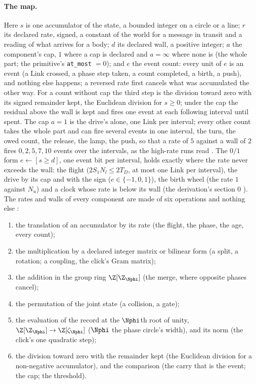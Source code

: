 \paragraph{The map.} Here $s$ is one accumulator of the state, a bounded integer on a circle
or a line; $r$ its declared rate, signed, a constant of the world for a
message in transit and a reading of what arrives for a body; $d$ its
declared wall, a positive integer; $a$ the component's cap, $1$ where a
cap is declared and $a = \infty$ where none is (the whole part; the
primitive's \texttt{at\_most} $= 0$); and $e$ the event count: every
unit of $e$ is an event (a Link crossed, a phase step taken, a count
completed, a birth, a push), and nothing else happens; a reversed rate
first cancels what was accumulated the other way. For a count without
cap the third step is the division toward zero with its signed remainder kept, the Euclidean division for $s \ge 0$;
under the cap the residual above the wall is kept and fires one event
at each following interval until spent. The cap $a = 1$ is the
drive's alone, one Link per interval; every other count takes the whole part and can fire several
events in one interval, the turn, the owed count, the release, the
lamp, the push, so that a rate of $5$ against a wall of $2$ fires $0,
2, 5, 7, 10$ events over the intervals, as the high-rate runs read \cite[record 340]{log}. The $0/1$ form $e \leftarrow [s \ge d]$,
one event bit per interval, holds exactly where the rate never exceeds
the wall: the flight ($2S_1N_l \le 2T_D$, at most one Link per
interval), the drive by its cap and with the sign ($e \in \{-1, 0,
1\}$), the birth wheel (the rate $1$ against
$N_u$) and a clock whose rate is below its wall (the derivation's section
0 \cite{derivations}). The rates and walls of every
component are made of six operations and nothing else
\cite{highlights,lawvector}:
\begin{enumerate}
\item the translation of an accumulator by its rate (the flight, the
phase, the age, every count);
\item the multiplication by a declared integer matrix or bilinear form
(a split, a rotation; a coupling, the click's Gram matrix);
\item the addition in the group ring $\Z[\Z_{\Nphi}]$ (the merge, where
opposite phases cancel);
\item the permutation of the joint state (a collision, a gate);
\item the evaluation of the record at the $\Nphi$th root of unity, $\Z[\Z_{\Nphi}]
\to \Z[\zeta_{\Nphi}]$ ($\Nphi$ the phase circle's width), and its norm (the
click's one quadratic step);
\item the division toward zero with the remainder kept (the Euclidean
division for a non-negative accumulator), and the
comparison (the carry that is the event; the cap; the threshold).
\end{enumerate}
